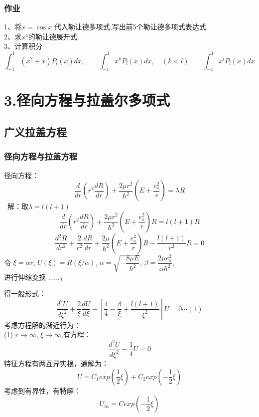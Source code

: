 \begin{frame}
	\frametitle{作业}
	1、将$x=\cos x$ 代入勒让德多项式,写出前5个勒让德多项式表达式 \\
	2、求$x^4$的勒让德展开式\\
	3、计算积分
	\begin{equation*}
		\int_{-1}^{1} (x^2+x) P_l(x) dx, \qquad \int_{-1}^{1} x^k P_l(x) dx, \quad(k<l) \qquad  	\int_{-1}^{1} x^l P_l(x) dx   
	\end{equation*}
\end{frame}	



\section{3.径向方程与拉盖尔多项式}

\subsection{广义拉盖方程}

\begin{frame}
	\frametitle{径向方程与拉盖方程}
	径向方程：
	\begin{equation*}
		\boxed{\frac{d}{d r} (r^2\frac{d R }{d r} ) + \frac{2 \mu r^2} {\hbar^2}(E+ \frac{e_s ^2}{r} ) =\lambda R}
	\end{equation*}	
	\alert{ 解：}取$ \lambda =l(l+1)  $
	\begin{equation*}
		\frac{d}{d r} (r^2\frac{d R }{d r} ) + \frac{2 \mu r^2} {\hbar^2}(E+ \frac{e_s ^2}{r} ) R=l(l+1) R
	\end{equation*}	
	\begin{equation*}
		\frac{d^2 R}{d r^2} + \frac{2}{r^2}\frac{d R }{d r}  + \frac{2 \mu} {\hbar^2}(E+ \frac{e_s ^2}{r} ) R- \frac{l(l+1)}{r^2} R=0
	\end{equation*}	
	令 $\xi=\alpha r$, $U(\xi)=R(\xi /\alpha) $, $\alpha =\sqrt{-\dfrac{8\mu E}{\hbar^2}}$, $\beta=\dfrac{2\mu e^2 _s}{\alpha \hbar^2}$,\\
	进行伸缩变换 ......，
\end{frame}	

\begin{frame}
	得一般形式：
	\begin{equation*}
		\frac{d^2 U}{d \xi ^2} + \frac{2}{\xi }\frac{d U }{d \xi}  -[ \frac{1} {4}  -\frac{\beta}{\xi} + \frac{l(l+1)}{\xi ^2}] U=0  \cdots (1)
	\end{equation*}	 
	考虑方程解的渐近行为： \\
	(1) $r\to \infty$, $\xi \to \infty$,有方程：
	\begin{equation*}
		\frac{d^2 U}{d \xi ^2}   - \frac{1} {4}  U=0
	\end{equation*}	
	特征方程有两互异实根，通解为：
	\begin{equation*}
		U=C_1 exp(\frac{1}{2}\xi ) +C_2 exp(-\frac{1}{2}\xi ) 
	\end{equation*}	
	考虑到有界性，有特解：
	\begin{equation*}
		U_\infty  =  C  exp(-\frac{1}{2}\xi ) 
	\end{equation*}	
\end{frame}	

